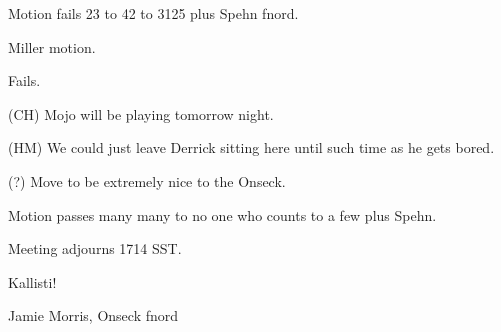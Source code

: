 Motion fails 23 to 42 to 3125 plus Spehn fnord.

Miller motion.

Fails.

(CH) Mojo will be playing tomorrow night.

(HM) We could just leave Derrick sitting here until such time as he 
gets bored.

(?) Move to be extremely nice to the Onseck.

Motion passes many many to no one who counts to a few plus Spehn.

Meeting adjourns 1714 SST.

\vspace{0.15in}
\begin{center}
Kallisti!

Jamie Morris, Onseck fnord
\end{center}

